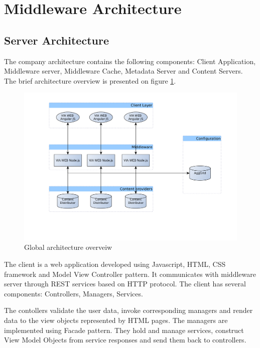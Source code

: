 \section{Middleware Architecture}

\subsection{Server Architecture}

The company architecture contains the following components: Client Application, Middleware server, Middleware Cache, Metadata Server and Content Servers. The brief architecture overview is presented on figure \ref{fig:arch_overview}. 


\begin{figure}[h]
    \centering
	\includegraphics[width=\textwidth]{images/thesis_global_architecture_existing.png}
    \caption{Global architecture overveiw}
    \label{fig:arch_overview}
\end{figure}


The client is a web application developed using Javascript, HTML, CSS framework and Model View Controller pattern. It communicates with middleware server through REST services based on HTTP protocol. The client has several components: Controllers, Managers, Services. 

The contollers validate the user data, invoke corresponding managers and render data to the view objects represented by HTML pages. The managers are implemented using Facade pattern\cite{DesignPatterns}. They hold and manage services, construct View Model Objects from service responses and send them back to controllers. 

